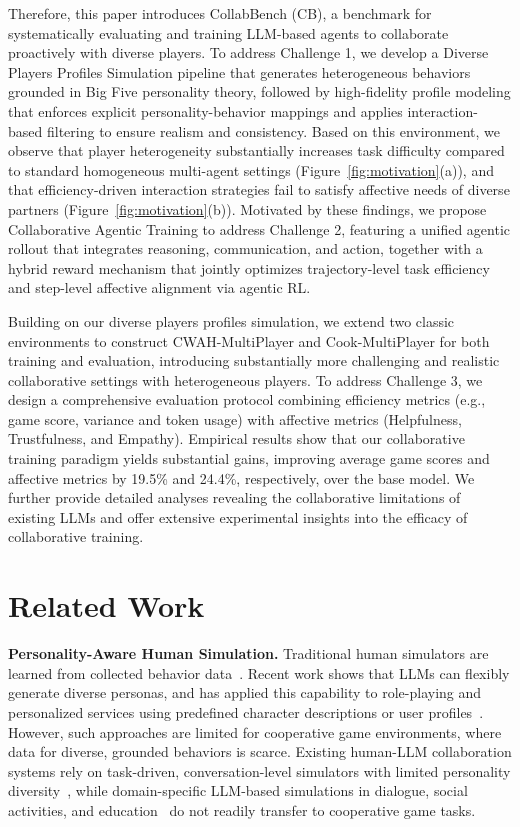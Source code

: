 \documentclass{article}
\theoremstyle{plain}
\theoremstyle{definition}
\theoremstyle{remark}
\begin{document}
Therefore, this paper introduces CollabBench (CB), a benchmark for systematically evaluating and training LLM-based agents to collaborate proactively with diverse players. To address Challenge 1, we develop a Diverse Players Profiles Simulation pipeline that generates heterogeneous behaviors grounded in Big Five personality theory, followed by high-fidelity profile modeling that enforces explicit personality-behavior mappings and applies interaction-based filtering to ensure realism and consistency. Based on this environment, we observe that player heterogeneity substantially increases task difficulty compared to standard homogeneous multi-agent settings (Figure~\ref{fig:motivation}(a)), and that efficiency-driven interaction strategies fail to satisfy affective needs of diverse partners (Figure~\ref{fig:motivation}(b)). Motivated by these findings, we propose Collaborative Agentic Training to address Challenge 2, featuring a unified agentic rollout that integrates reasoning, communication, and action, together with a hybrid reward mechanism that jointly optimizes trajectory-level task efficiency and step-level affective alignment via agentic RL.


Building on our diverse players profiles simulation, we extend two classic environments to construct CWAH-MultiPlayer and Cook-MultiPlayer for both training and evaluation, introducing substantially more challenging and realistic collaborative settings with heterogeneous players. To address Challenge 3, we design a comprehensive evaluation protocol combining efficiency metrics (e.g., game score, variance and token usage) with affective metrics (Helpfulness, Trustfulness, and Empathy). Empirical results show that our collaborative training paradigm yields substantial gains, improving average game scores and affective metrics by 19.5\% and 24.4\%, respectively, over the base model. We further provide detailed analyses revealing the collaborative limitations of existing LLMs and offer extensive experimental insights into the efficacy of collaborative training.


\section{Related Work}

\textbf{Personality-Aware Human Simulation.} Traditional human simulators are learned from collected behavior data~\cite{CarrollSHGSAD19}. Recent work shows that LLMs can flexibly generate diverse personas, and has applied this capability to role-playing and personalized services using predefined character descriptions or user profiles~\cite{kosinski2024evaluating,SalminenLPCHJ24,ShinHRLO24,WangPQLZWGGN00024,TuFTSSGY24,0001WZY00YGC00X25,SalemiMBZ24}. However, such approaches are limited for cooperative game environments, where data for diverse, grounded behaviors is scarce. Existing human-LLM collaboration systems rely on task-driven, conversation-level simulators with limited personality diversity~\cite{WuGP0LDC0L025}, while domain-specific LLM-based simulations in dialogue, social activities, and education~\cite{WangYZQSBN024,zhang2025echo,ParkOCMLB23,LiuYLC24} do not readily transfer to cooperative game tasks.
\end{document}
